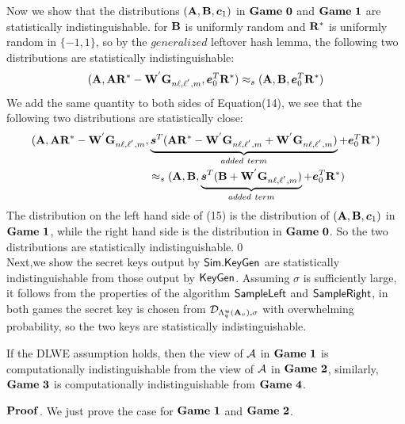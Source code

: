 Now we show that the distributions $(\mathbf{A}, \mathbf{B},\boldsymbol{c}_{1})$ in $\mathbf{Game\ 0}$ and $\mat{Game\ 1}$ are statistically indistinguishable. for $\mathbf{B}$ is uniformly random and $\mathbf{R}^{*}$ is uniformly random in $\{-1,1\}$, so by the $generalized$ leftover hash lemma, the following two distributions are statistically indistinguishable:
\begin{equation}
(\mathbf{A},\mathbf{A}\mathbf{R}^{*}-\mathbf{W}^{'}\mathbf{G}_{n\ell , \ell^{'},m}, \boldsymbol{e}^{T}_{0}\mathbf{R}^{*})\approx_{s}(\mathbf{A,B},\boldsymbol{e}^{T}_{0}\mathbf{R}^{*})
\end{equation}
We add the same quantity to both sides of Equation(14), we see that the following two distributions are statistically close:
\begin{equation}
\begin{split}
(\mathbf{A},\mathbf{A}\mathbf{R}^{*}-\mathbf{W}^{'}\mathbf{G}_{n\ell , \ell^{'},m},& \underbrace{\boldsymbol{s}^{T}(\mathbf{A}\mathbf{R}^{*}-\mathbf{W}^{'}\mathbf{G}_{n\ell , \ell^{'},m}+\mathbf{W}^{'}\mathbf{G}_{n\ell , \ell^{'},m})}
_{added\ term}+\boldsymbol{e}^{T}_{0}\mathbf{R}^{*})\\
&\approx_{s}(\mathbf{A,B},\underbrace{\boldsymbol{s}^{T}(\mathbf{B}+\mathbf{W}^{'}\mathbf{G}_{n\ell , \ell^{'},m})}_{added\ term}+\boldsymbol{e}^{T}_{0}\mathbf{R}^{*})\\
\end{split}
\end{equation}
The distribution on the left hand side of (15) is the distribution of $(\mathbf{A,B},\boldsymbol{c}_{1})$ in $\mat{Game\ 1}$, while the right hand side is the distribution in $\mathbf{Game\ 0}$. So the two distributions are statistically indistinguishable.\qed \\[0.2cm]

Next,we show the secret keys output by $\mathsf{Sim}.\mathsf{KeyGen}$ are statistically indistinguishable from those output by $\mathsf{KeyGen}$. Assuming $\sigma$ is sufficiently large, it follows from the properties of the algorithm $\mathsf{SampleLeft}$ and $\mathsf{SampleRight}$,  in both games the secret key is chosen from $\mathcal{D}_{\Lambda^{\boldsymbol{u}}_{q}(\mathbf{A}_{v}),\sigma}$ with overwhelming probability, so the two keys are statistically indistinguishable.
\begin{lemma}
If the DLWE assumption holds, then the view of $\mathcal{A}$ in $\mat{Game\ 1}$ is computationally indistinguishable from the view of $\mathcal{A}$ in $\mat{Game\ 2}$, similarly, $\mathbf{Game\ 3}$ is computationally indistinguishable from $\mathbf{Game\ 4}$.
\end{lemma}
\noindent $\mathbf{Proof}$. We just prove the case for $\mat{Game\ 1}$ and $\mat{Game\ 2}$.\

